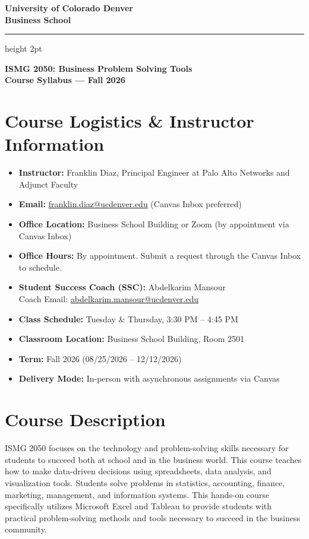 \documentclass[11pt,a4paper]{article}
\begin{document}
\begin{center}
    {\LARGE \bfseries University of Colorado Denver} \\
    \vspace{2mm}
    {\Large \bfseries Business School} \\
    \vspace{4mm}
    {\color{cudenvergold}\hrule height 2pt}
    \vspace{3mm}
    {\large \bfseries ISMG 2050: Business Problem Solving Tools} \\
    {\large \bfseries Course Syllabus --- Fall 2026} \\
\end{center}

\vspace{0.5cm}

\section*{Course Logistics \& Instructor Information}
\begin{itemize}[leftmargin=*]
    \item \textbf{Instructor:} Franklin Diaz, Principal Engineer at Palo Alto Networks and Adjunct Faculty
    \item \textbf{Email:} \href{mailto:franklin.diaz@ucdenver.edu}{franklin.diaz@ucdenver.edu} (Canvas Inbox preferred)
    \item \textbf{Office Location:} Business School Building or Zoom (by appointment via Canvas Inbox)
    \item \textbf{Office Hours:} By appointment. Submit a request through the Canvas Inbox to schedule.
    \item \textbf{Student Success Coach (SSC):} Abdelkarim Mansour \\
          Coach Email: \href{mailto:abdelkarim.mansour@ucdenver.edu}{abdelkarim.mansour@ucdenver.edu}
    \item \textbf{Class Schedule:} Tuesday \& Thursday, 3:30 PM -- 4:45 PM
    \item \textbf{Classroom Location:} Business School Building, Room 2501
    \item \textbf{Term:} Fall 2026 (08/25/2026 -- 12/12/2026)
    \item \textbf{Delivery Mode:} In-person with asynchronous assignments via Canvas
\end{itemize}

\section*{Course Description}
ISMG 2050 focuses on the technology and problem-solving skills necessary for students to succeed both at school and in the business world. This course teaches how to make data-driven decisions using spreadsheets, data analysis, and visualization tools. Students solve problems in statistics, accounting, finance, marketing, management, and information systems. This hands-on course specifically utilizes Microsoft Excel and Tableau to provide students with practical problem-solving methods and tools necessary to succeed in the business community.
\end{document}
